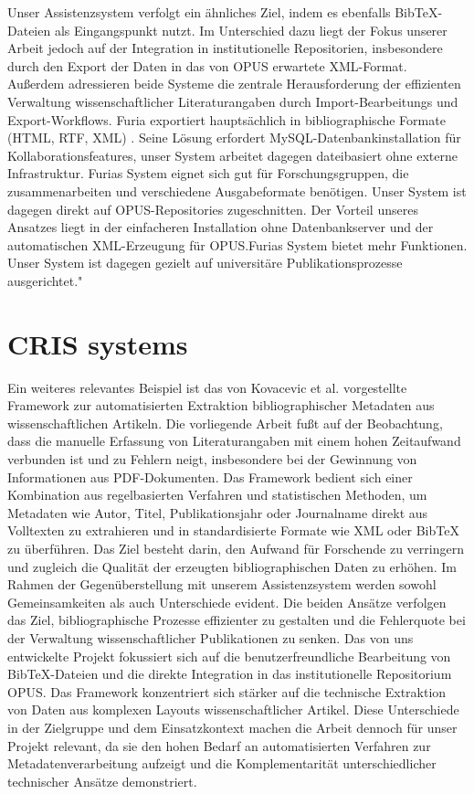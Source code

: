 \noindent Unser Assistenzsystem verfolgt ein ähnliches Ziel, indem es ebenfalls 
Bib\TeX{}-Dateien als Eingangspunkt nutzt. Im Unterschied dazu liegt der 
Fokus unserer Arbeit jedoch auf der Integration in institutionelle 
Repositorien, insbesondere durch den Export der Daten in das von OPUS 
erwartete XML-Format. Außerdem adressieren beide Systeme die zentrale Herausforderung der
effizienten Verwaltung wissenschaftlicher Literaturangaben durch Import-Bearbeitungs und Export-Workflows.
Furia exportiert  hauptsächlich in bibliographische Formate (HTML, RTF, XML) .
Seine Lösung erfordert MySQL-Datenbankinstallation für Kollaborationsfeatures, unser System arbeitet dagegen dateibasiert
ohne externe Infrastruktur. Furias System eignet sich gut für Forschungsgruppen, die zusammenarbeiten und verschiedene Ausgabeformate benötigen.
Unser System ist dagegen direkt auf OPUS-Repositories zugeschnitten. Der Vorteil unseres Ansatzes liegt in der einfacheren
Installation ohne Datenbankserver und der automatischen XML-Erzeugung für OPUS.Furias System bietet mehr Funktionen. 
Unser System ist dagegen  gezielt auf universitäre Publikationsprozesse ausgerichtet."

\section{CRIS systems}
Ein weiteres relevantes Beispiel ist das von Kovacevic et al. 
\cite{kovavcevic2011automatic} vorgestellte Framework zur automatisierten 
Extraktion bibliographischer Metadaten aus wissenschaftlichen Artikeln. 
Die vorliegende Arbeit fußt auf der Beobachtung, dass die manuelle 
Erfassung von Literaturangaben mit einem hohen Zeitaufwand verbunden 
ist und zu Fehlern neigt, insbesondere bei der Gewinnung von 
Informationen aus PDF-Dokumenten. Das Framework bedient sich 
einer Kombination aus regelbasierten Verfahren und statistischen 
Methoden, um Metadaten wie Autor, Titel, Publikationsjahr oder 
Journalname direkt aus Volltexten zu extrahieren und in standardisierte 
Formate wie XML oder BibTeX zu überführen. Das Ziel besteht darin, den 
Aufwand für Forschende zu verringern und zugleich die Qualität der 
erzeugten bibliographischen Daten zu erhöhen. Im Rahmen der 
Gegenüberstellung mit unserem Assistenzsystem werden sowohl 
Gemeinsamkeiten als auch Unterschiede evident. Die beiden Ansätze 
verfolgen das Ziel, bibliographische Prozesse effizienter zu gestalten 
und die Fehlerquote bei der Verwaltung wissenschaftlicher Publikationen 
zu senken. Das von uns entwickelte Projekt fokussiert sich auf die 
benutzerfreundliche Bearbeitung von BibTeX-Dateien und die direkte 
Integration in das institutionelle Repositorium OPUS. Das Framework 
konzentriert sich stärker auf die technische Extraktion von Daten aus 
komplexen Layouts wissenschaftlicher Artikel. Diese Unterschiede in der 
Zielgruppe und dem Einsatzkontext machen die Arbeit dennoch für unser 
Projekt relevant, da sie den hohen Bedarf an automatisierten Verfahren 
zur Metadatenverarbeitung aufzeigt und die Komplementarität unterschiedlicher 
technischer Ansätze demonstriert.